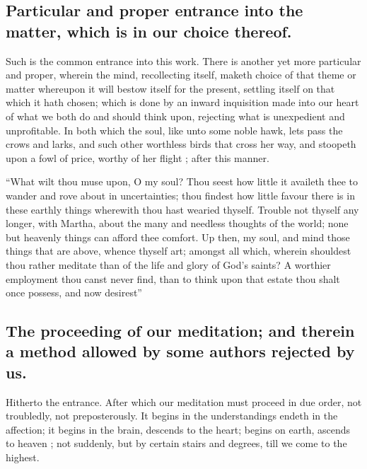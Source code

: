 \subsection{Particular and proper entrance into the matter, which is in our choice thereof.}
Such is the common entrance into this work. There is another yet more particular and proper, wherein the mind, recollecting itself, maketh choice of that theme or matter whereupon it will bestow itself for the present, settling itself on that which it hath chosen; which is done by an inward inquisition made into our heart of what we both do and should think upon, rejecting what is unexpedient and unprofitable. In both which the soul, like unto some noble hawk, lets pass the crows and larks, and such other worthless birds that cross her way, and stoopeth upon a fowl of price, worthy of her flight ; after this manner. 

``What wilt thou muse upon, O my soul? Thou seest how little it availeth thee to wander and rove about in uncertainties; thou findest how little favour there is in these earthly things wherewith thou hast wearied thyself. Trouble not thyself any longer, with Martha, about the many and needless thoughts of the world; none but heavenly things can afford thee comfort. Up then, my soul, and mind those things that are above, whence thyself art; amongst all which, wherein shouldest thou rather meditate than of the life and glory of God's saints? A worthier employment thou canst never find, than to think upon that estate thou shalt once possess, and now desirest''

\subsection{The proceeding of our meditation; and therein a method allowed by some authors rejected by us.}
Hitherto the entrance. After which our meditation must proceed in due order, not troubledly, not preposterously. It begins in the understandings endeth in the affection; it begins in the brain, descends to the heart; begins on earth, ascends to heaven ; not suddenly, but by certain stairs and degrees, till we come to the highest. 

